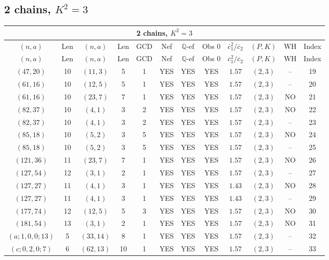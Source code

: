 \subsection{2 chains, $K^2 = 3$}
\begin{longtable}{|c|c|c|c|c|c|c|c|c|c|c|c|}
\hline
\multicolumn{12}{|c|}{2 chains, $K^2 = 3$}\\
\hline
$(n,a)$ & Len & $(n,a)$ & Len & GCD & Nef & $\mathbb Q$-ef & Obs 0 & $\overline c_1^2 / \overline c_2$ & $(P,K)$ & WH & Index\\
\hline
\endfirsthead

\hline
$(n,a)$ & Len & $(n,a)$ & Len & GCD & Nef & $\mathbb Q$-ef & Obs 0 & $\overline c_1^2 / \overline c_2$ & $(P,K)$ & WH & Index\\
\hline
\endhead
\hline
\endfoot

$(47,20)$ & 10 & $(11,3)$ & 5 & 1 & YES & YES & YES & $1.57$ & $(2,3)$ & -- & 19\\
$(61,16)$ & 10 & $(12,5)$ & 5 & 1 & YES & YES & YES & $1.57$ & $(2,3)$ & -- & 20\\
$(61,16)$ & 10 & $(23,7)$ & 7 & 1 & YES & YES & YES & $1.57$ & $(2,3)$ & NO & 21\\
$(82,37)$ & 10 & $(4,1)$ & 3 & 2 & YES & YES & YES & $1.57$ & $(2,3)$ & NO & 22\\
$(82,37)$ & 10 & $(4,1)$ & 3 & 2 & YES & YES & YES & $1.57$ & $(2,3)$ & -- & 23\\
$(85,18)$ & 10 & $(5,2)$ & 3 & 5 & YES & YES & YES & $1.57$ & $(2,3)$ & NO & 24\\
$(85,18)$ & 10 & $(5,2)$ & 3 & 5 & YES & YES & YES & $1.57$ & $(2,3)$ & -- & 25\\
$(121,36)$ & 11 & $(23,7)$ & 7 & 1 & YES & YES & YES & $1.57$ & $(2,3)$ & NO & 26\\
$(127,54)$ & 12 & $(3,1)$ & 2 & 1 & YES & YES & YES & $1.57$ & $(2,3)$ & -- & 27\\
$(127,27)$ & 11 & $(4,1)$ & 3 & 1 & YES & YES & YES & $1.43$ & $(2,3)$ & NO & 28\\
$(127,27)$ & 11 & $(4,1)$ & 3 & 1 & YES & YES & YES & $1.43$ & $(2,3)$ & -- & 29\\
$(177,74)$ & 12 & $(12,5)$ & 5 & 3 & YES & YES & YES & $1.57$ & $(2,3)$ & NO & 30\\
$(181,54)$ & 13 & $(3,1)$ & 2 & 1 & YES & YES & YES & $1.57$ & $(2,3)$ & NO & 31\\
$(a;1,0,0;13)$ & 5 & $(33,14)$ & 8 & 1 & YES & YES & YES & $1.57$ & $(2,3)$ & -- & 32\\
$(c;0,2,0;7)$ & 6 & $(62,13)$ & 10 & 1 & YES & YES & YES & $1.57$ & $(2,3)$ & -- & 33
\end{longtable}
